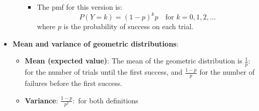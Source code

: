 \documentclass{report}
\begin{document}
\begin{itemize}
\begin{enumerate}
                \begin{itemize}
                    \item The pmf for this version is:
                        \[
                            P(Y = k) = (1 - p)^k p \quad \text{for } k = 0, 1, 2, \ldots
                        \]
                        where \( p \) is the probability of success on each trial.
                \end{itemize}
        \end{enumerate}
    \item \textbf{Mean and variance of geometric distributions}:
        \begin{itemize}
            \item \textbf{Mean (expected value)}: The mean of the geometric distribution is $\frac{1}{p}:$ for the number of trials until the first success, and 
                $\frac{1-p}{p}$ for the number of failures before the first success.
            \item \textbf{Variance}: $\frac{1-p}{p^{2}}:$ for both definitions
        \end{itemize}
        

\end{itemize}
\end{document}
